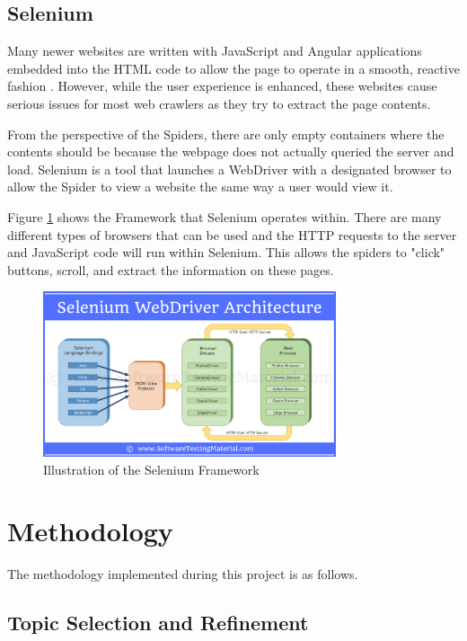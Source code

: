 \documentclass[5p,authoryear]{elsarticle}
\begin{document}
\subsection{Selenium}\label{Selenium}

Many newer websites are written with JavaScript and Angular applications embedded into the HTML code to allow the page to operate in a smooth, reactive fashion \citep{angular}. However, while the user experience is enhanced, these websites cause serious issues for most web crawlers as they try to extract the page contents. 

From the perspective of the Spiders, there are only empty containers where the contents should be because the webpage does not actually queried the server and load. Selenium is a tool that launches a WebDriver with a designated browser to allow the Spider to view a website the same way a user would view it. 

Figure \ref{Selenium_Framework} shows the Framework that Selenium operates within. There are many different types of browsers that can be used and the HTTP requests to the server and JavaScript code will run within Selenium. This allows the spiders to "click" buttons, scroll, and extract the information on these pages.


\begin{figure}[!htb] \centering
	\includegraphics[width=3.4in]{figures/Selenium_Framework.png}
	\caption[]{Illustration of the Selenium Framework} 
	\label{Selenium_Framework} 
\end{figure}


\section{Methodology}\label{meth}


The methodology implemented during this project is as follows. 


\subsection{Topic Selection and Refinement}\label{chat}
\end{document}
